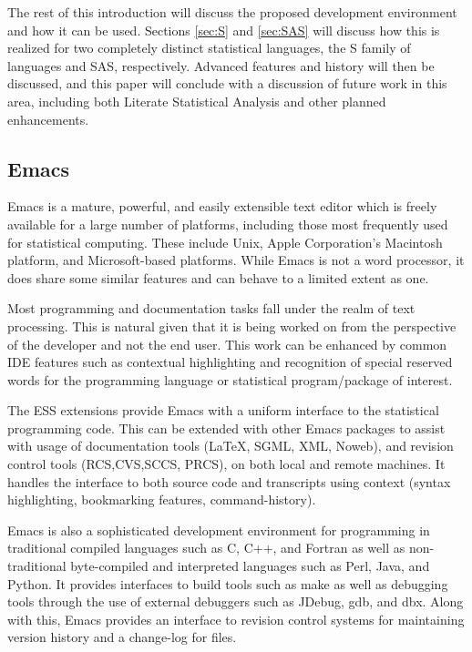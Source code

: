 \documentclass{article}
\begin{document}
The rest of this introduction will discuss the proposed development
environment and how it can be used.  Sections \ref{sec:S} and
\ref{sec:SAS} will discuss how this is realized for two completely
distinct statistical languages, the S family of languages and SAS,
respectively.  Advanced features and history will then be discussed,
and this paper will conclude with a discussion of future work in this
area, including both Literate Statistical Analysis and other planned
enhancements.

\subsection{Emacs}
\label{sec:intro:emacs}

Emacs \citep{RMS:2000} is a mature, powerful, and easily extensible
text editor which is freely available for a large number of platforms,
including those most frequently used for statistical computing.  These
include Unix, Apple Corporation's Macintosh platform, and
Microsoft-based platforms.  While Emacs is not a word processor, it
does share some similar features and can behave to a limited extent as
one.

Most programming and documentation tasks fall under the realm of text
processing.  This is natural given that it is being worked on from the
perspective of the developer and not the end user.  This work can be
enhanced by common IDE features such as contextual highlighting and
recognition of special reserved words for the programming language or
statistical program/package of interest.

The ESS extensions provide Emacs with a uniform interface to the
statistical programming code.  This can be extended with other Emacs
packages to assist with usage of documentation tools (\LaTeX, SGML,
XML, Noweb), and revision control tools (RCS,CVS,SCCS, PRCS), on both
local and remote machines.  It handles the interface to both source
code and transcripts using context (syntax highlighting, bookmarking
features, command-history).

Emacs is also a sophisticated development environment for programming
in traditional compiled languages such as C, C++, and Fortran as well
as non-traditional byte-compiled and interpreted languages such as
Perl, Java, and Python.  It provides interfaces to build tools such as
make as well as debugging tools through the use of external debuggers
such as JDebug, gdb, and dbx. Along with this, Emacs provides an
interface to revision control systems for maintaining version history
and a change-log for files.
\end{document}
